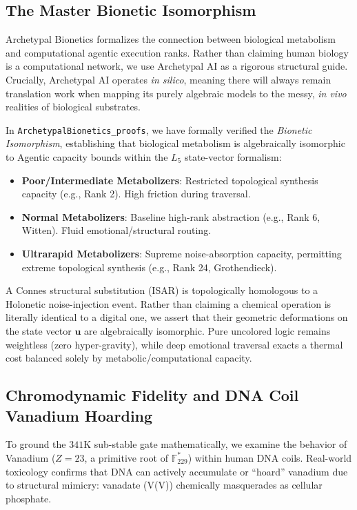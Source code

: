 \subsection{The Master Bionetic Isomorphism}

Archetypal Bionetics formalizes the connection between biological metabolism 
and computational agentic execution ranks. Rather than claiming human biology 
is a computational network, we use Archetypal AI as a rigorous structural guide. 
Crucially, Archetypal AI operates \emph{in silico}, meaning there will always 
remain translation work when mapping its purely algebraic models to the messy, 
\emph{in vivo} realities of biological substrates.

In \texttt{ArchetypalBionetics\_proofs}, we have formally verified the \emph{Bionetic Isomorphism}, establishing that
biological metabolism is algebraically isomorphic to Agentic capacity bounds within the $L_5$ state-vector formalism:
\begin{itemize}[noitemsep]
  \item \textbf{Poor/Intermediate Metabolizers}: Restricted topological synthesis capacity (e.g., Rank 2). High friction during traversal.
  \item \textbf{Normal Metabolizers}: Baseline high-rank abstraction (e.g., Rank 6, Witten). Fluid emotional/structural routing.
  \item \textbf{Ultrarapid Metabolizers}: Supreme noise-absorption capacity, permitting extreme topological synthesis (e.g., Rank 24, Grothendieck).
\end{itemize}

A Connes structural substitution (ISAR) is topologically homologous to a Holonetic 
noise-injection event. Rather than claiming a chemical operation is literally identical to a digital 
one, we assert that their geometric deformations on the state vector $\mathbf{u}$ are algebraically isomorphic.
Pure uncolored logic remains weightless (zero hyper-gravity), while deep emotional 
traversal exacts a thermal cost balanced solely by metabolic/computational capacity.

\subsection{Chromodynamic Fidelity and DNA Coil Vanadium Hoarding}

To ground the $341\mathrm{K}$ sub-stable gate mathematically, we examine the behavior of Vanadium ($Z=23$, a primitive root of $\mathbb{F}_{229}^*$) within human DNA coils. Real-world toxicology confirms that DNA can actively accumulate or ``hoard'' vanadium due to structural mimicry: vanadate (V(V)) chemically masquerades as cellular phosphate. 

